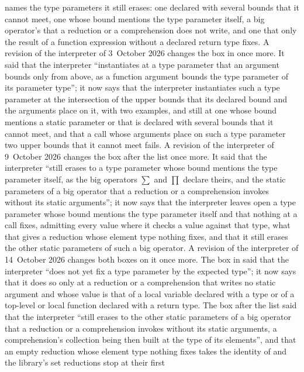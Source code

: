\begin{description}
names the type parameters it still erases: one declared with several bounds
that it cannot meet, one whose bound mentions the type parameter itself, a big
operator's that a reduction or a comprehension does not write, and one that
only the result of a function expression without a declared return type
fixes.
A revision of the interpreter of 3~October 2026 changes the box in
 once more.
It said that the interpreter ``instantiates at  a type
parameter that an argument bounds only from above, as a function argument
bounds the type parameter of its parameter type''; it now says that the
interpreter instantiates such a type parameter at the intersection of the upper
bounds that its declared bound and the arguments place on it, with two
examples, and still at  one whose bound mentions a static
parameter or that is declared with several bounds that it cannot meet, and
that a call whose arguments place on such a type parameter two upper bounds
that it cannot meet fails.
A revision of the interpreter of 9~October 2026 changes the box after the list
once more.
It said that the interpreter ``still erases to  a type
parameter whose bound mentions the type parameter itself, as the big operators
$\sum$ and $\prod$ declare theirs, and the static parameters of a big operator
that a reduction or a comprehension invokes without its static arguments''; it
now says that the interpreter leaves open a type parameter whose bound mentions
the type parameter itself and that nothing at a call fixes, admitting every
value where it checks a value against that type, what that gives a reduction
whose element type nothing fixes, and that it still erases the other static
parameters of such a big operator.
A revision of the interpreter of 14~October 2026 changes both boxes on it once
more.
The box in  said that the interpreter ``does not
yet fix a type parameter by the expected type''; it now says that it does so
only at a reduction or a comprehension that writes no static argument and whose
value is that of a local variable declared with a type or of a top-level or
local function declared with a return type.
The box after the list said that the interpreter ``still erases to
 the other static parameters of a big operator that a
reduction or a comprehension invokes without its static arguments, a
comprehension's collection being then built at the type of its elements'', and
that an empty reduction whose element type nothing fixes takes the identity of
 and the library's set reductions stop at their first

\end{description}
